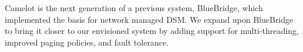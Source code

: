 Camelot is the next generation of a previous system, BlueBridge, which
implemented the basis for network managed DSM. We expand upon BlueBridge to
bring it closer to our envisioned system by adding support for multi-threading,
improved paging policies, and fault tolerance.


